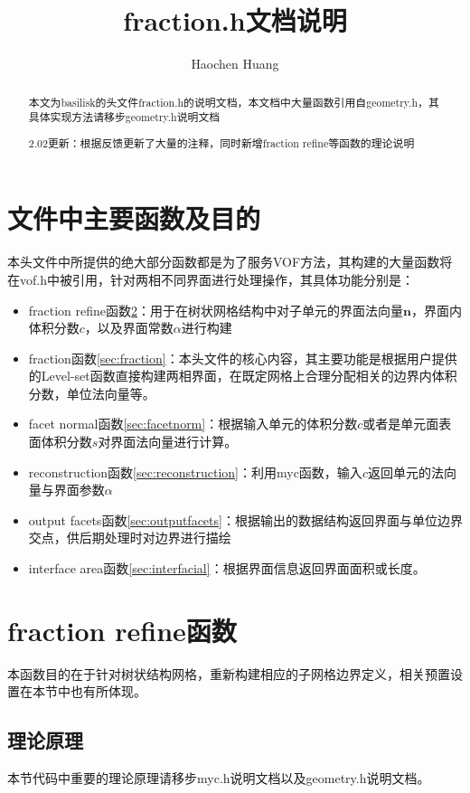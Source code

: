 \documentclass[lang=cn,11pt,a4paper]{elegantpaper}
\title{fraction.h文档说明}
\author{Haochen Huang}
\date{\zhtoday}
\begin{document}
\maketitle
\tableofcontents

\begin{abstract}
本文为basilisk的头文件fraction.h的说明文档，本文档中大量函数引用自geometry.h，其具体实现方法请移步geometry.h说明文档\par
2.02更新：根据反馈更新了大量的注释，同时新增fraction refine等函数的理论说明
\end{abstract}


\section{文件中主要函数及目的}
本头文件中所提供的绝大部分函数都是为了服务VOF方法，其构建的大量函数将在vof.h中被引用，针对两相不同界面进行处理操作，其具体功能分别是：
\begin{itemize}
    \item fraction refine函数\ref{sec:fracrefine}：用于在树状网格结构中对子单元的界面法向量$\mathbf{n}$，界面内体积分数$c$，以及界面常数$\alpha$进行构建
    \item fraction函数\ref{sec:fraction}：本头文件的核心内容，其主要功能是根据用户提供的Level-set函数直接构建两相界面，在既定网格上合理分配相关的边界内体积分数，单位法向量等。
    \item facet normal函数\ref{sec:facetnorm}：根据输入单元的体积分数$c$或者是单元面表面体积分数$s$对界面法向量进行计算。
    \item reconstruction函数\ref{sec:reconstruction}：利用myc函数，输入$c$返回单元的法向量与界面参数$\alpha$
    \item output facets函数\ref{sec:outputfacets}：根据输出的数据结构返回界面与单位边界交点，供后期处理时对边界进行描绘
    \item interface area函数\ref{sec:interfacial}：根据界面信息返回界面面积或长度。
\end{itemize}
\section{fraction refine函数}\label{sec:fracrefine}
本函数目的在于针对树状结构网格，重新构建相应的子网格边界定义，相关预置设置在本节中也有所体现。
\subsection{理论原理}
本节代码中重要的理论原理请移步myc.h说明文档以及geometry.h说明文档。
\end{document}
